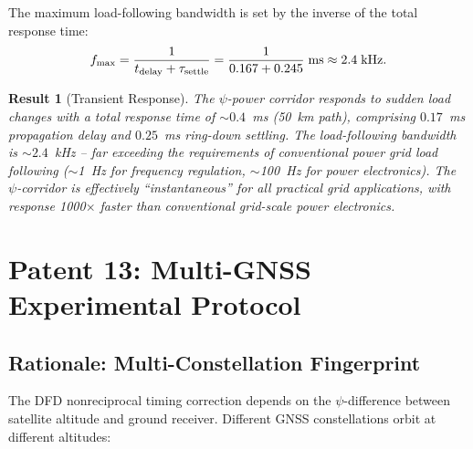 \documentclass[aps,prd,twocolumn,superscriptaddress,nofootinbib]{revtex4-2}
\newtheorem{result}{Result}
\begin{document}
The maximum load-following bandwidth is set by the inverse of the
total response time:
\begin{equation}
f_{\rm max} = \frac{1}{t_{\rm delay} + \tau_{\rm settle}}
= \frac{1}{0.167 + 0.245}\;\si{ms}
\approx 2.4\;\si{kHz}.
\label{eq:bandwidth}
\end{equation}

\begin{result}[Transient Response]
The $\psi$-power corridor responds to sudden load changes with a
total response time of $\sim 0.4$~ms (50~km path), comprising
$0.17$~ms propagation delay and $0.25$~ms ring-down settling.
The load-following bandwidth is $\sim 2.4$~kHz -- far exceeding the
requirements of conventional power grid load following ($\sim$1~Hz
for frequency regulation, $\sim$100~Hz for power electronics).
The $\psi$-corridor is effectively ``instantaneous'' for all
practical grid applications, with response 1000$\times$ faster
than conventional grid-scale power electronics.
\end{result}


\section{Patent 13: Multi-GNSS Experimental Protocol}
\label{sec:multi_gnss}

\subsection{Rationale: Multi-Constellation Fingerprint}

The DFD nonreciprocal timing correction depends on the
$\psi$-difference between satellite altitude and ground receiver.
Different GNSS constellations orbit at different altitudes:
\end{document}
